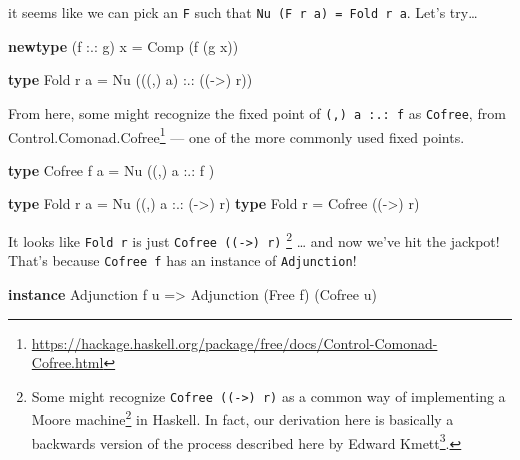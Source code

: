 \documentclass[]{article}
\newenvironment{Shaded}{}{}
\newcommand{\DataTypeTok}[1]{\textcolor[rgb]{0.56,0.13,0.00}{#1}}
\newcommand{\KeywordTok}[1]{\textcolor[rgb]{0.00,0.44,0.13}{\textbf{#1}}}
\newcommand{\NormalTok}[1]{#1}
\newcommand{\OperatorTok}[1]{\textcolor[rgb]{0.40,0.40,0.40}{#1}}
\newcommand{\OtherTok}[1]{\textcolor[rgb]{0.00,0.44,0.13}{#1}}
\renewcommand{\href}[2]{#2\footnote{\url{#1}}}
\begin{document}
it seems like we can pick an \texttt{F} such that
\texttt{Nu\ (F\ r\ a)\ =\ Fold\ r\ a}. Let's try\ldots{}

\begin{Shaded}
\begin{Highlighting}[]
\KeywordTok{newtype}\NormalTok{ (f }\OperatorTok{:.:}\NormalTok{ g) x }\OtherTok{=} \DataTypeTok{Comp}\NormalTok{ (f (g x))}

\KeywordTok{type} \DataTypeTok{Fold}\NormalTok{ r a }\OtherTok{=} \DataTypeTok{Nu}\NormalTok{ (((,) a) }\OperatorTok{:.:}\NormalTok{ ((}\OtherTok{{-}>}\NormalTok{) r))}
\end{Highlighting}
\end{Shaded}

From here, some might recognize the fixed point of \texttt{(,)\ a\ :.:\ f} as
\texttt{Cofree}, from
\href{https://hackage.haskell.org/package/free/docs/Control-Comonad-Cofree.html}{Control.Comonad.Cofree}
--- one of the more commonly used fixed points.

\begin{Shaded}
\begin{Highlighting}[]
\KeywordTok{type} \DataTypeTok{Cofree}\NormalTok{ f a }\OtherTok{=} \DataTypeTok{Nu}\NormalTok{ ((,) a }\OperatorTok{:.:}\NormalTok{ f     )}

\KeywordTok{type} \DataTypeTok{Fold}\NormalTok{ r a   }\OtherTok{=} \DataTypeTok{Nu}\NormalTok{ ((,) a }\OperatorTok{:.:}\NormalTok{ (}\OtherTok{{-}>}\NormalTok{) r)}
\KeywordTok{type} \DataTypeTok{Fold}\NormalTok{ r     }\OtherTok{=} \DataTypeTok{Cofree}\NormalTok{ ((}\OtherTok{{-}>}\NormalTok{) r)}
\end{Highlighting}
\end{Shaded}

It looks like \texttt{Fold\ r} is just \texttt{Cofree\ ((-\textgreater{})\ r)}
\footnote{Some might recognize \texttt{Cofree\ ((-\textgreater{})\ r)} as a
  common way of implementing a
  \href{https://en.wikipedia.org/wiki/Moore_machine}{Moore machine} in Haskell.
  In fact, our derivation here is basically a backwards version of
  \href{https://www.schoolofhaskell.com/user/edwardk/moore/for-less}{the process
  described here by Edward Kmett}.} \ldots{} and now we've hit the jackpot!
That's because \texttt{Cofree\ f} has an instance of \texttt{Adjunction}!

\begin{Shaded}
\begin{Highlighting}[]
\KeywordTok{instance} \DataTypeTok{Adjunction}\NormalTok{ f u }\OtherTok{=>} \DataTypeTok{Adjunction}\NormalTok{ (}\DataTypeTok{Free}\NormalTok{ f) (}\DataTypeTok{Cofree}\NormalTok{ u)}
\end{Highlighting}
\end{Shaded}
\end{document}
